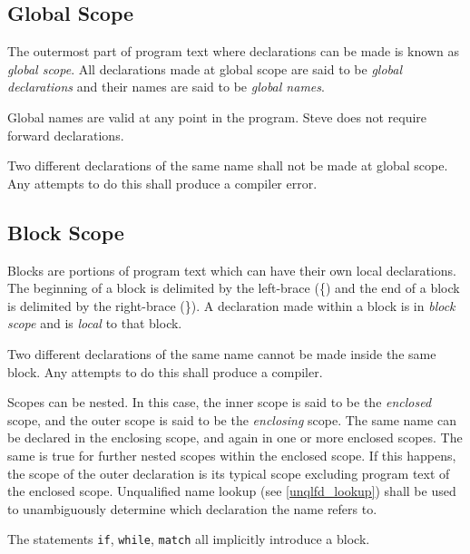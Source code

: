 \subsection{Global Scope} \label{global_scope}

The outermost part of program text where declarations can be made is known as \textit{global scope}. All declarations made at global scope are said to be \textit{global declarations} and their names are said to be \textit{global names}.

Global names are valid at any point in the program. Steve does not require forward declarations.

Two different declarations of the same name shall not be made at global scope. Any attempts to do this shall produce a compiler error.

\subsection{Block Scope} \label{block_scope}

Blocks are portions of program text which can have their own local declarations. The beginning of a block is delimited by the left-brace (\{) and the end of a block is delimited by the right-brace (\}). A declaration made within a block is in \textit{block scope} and is \textit{local} to that block.

Two different declarations of the same name cannot be made inside the same block. Any attempts to do this shall produce a compiler.

Scopes can be nested. In this case, the inner scope is said to be the \textit{enclosed} scope, and the outer scope is said to be the \textit{enclosing} scope. The same name can be declared in the enclosing scope, and again in one or more enclosed scopes. The same is true for further nested scopes within the enclosed scope. If this happens, the scope of the outer declaration is its typical scope excluding program text of the enclosed scope. Unqualified name lookup (see \ref{unqlfd_lookup}) shall be used to unambiguously determine which declaration the name refers to.

The statements \texttt{if}, \texttt{while}, \texttt{match} all implicitly introduce a block.


